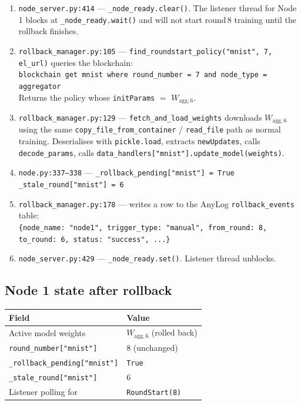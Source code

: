 \documentclass[11pt,a4paper]{article}
\newcommand{\Wagg}[1]{$W_{\text{agg},#1}$}
\begin{document}
\begin{enumerate}
  \item \texttt{node\_server.py:414} --- \texttt{\_node\_ready.clear()}.
        The listener thread for Node\,1 blocks at
        \texttt{\_node\_ready.wait()} and will not start round\,8
        training until the rollback finishes.

  \item \texttt{rollback\_manager.py:105} ---
        \texttt{find\_roundstart\_policy("mnist", 7, el\_url)}
        queries the blockchain:\\
        \texttt{blockchain get mnist where round\_number = 7 and node\_type = aggregator}\\
        Returns the policy whose \texttt{initParams} $=$ \Wagg{6}.

  \item \texttt{rollback\_manager.py:129} ---
        \texttt{fetch\_and\_load\_weights} downloads \Wagg{6} using the same
        \texttt{copy\_file\_from\_container} / \texttt{read\_file} path as
        normal training.  Deserialises with \texttt{pickle.load},
        extracts \texttt{newUpdates}, calls \texttt{decode\_params},
        calls \texttt{data\_handlers["mnist"].update\_model(weights)}.

  \item \texttt{node.py:337--338} ---
        \texttt{\_rollback\_pending["mnist"] = True}\\
        \texttt{\_stale\_round["mnist"] = 6}

  \item \texttt{rollback\_manager.py:178} --- writes a row to the
        AnyLog \texttt{rollback\_events} table:\\
        \texttt{\{node\_name: "node1", trigger\_type: "manual",
        from\_round: 8, to\_round: 6, status: "success", ...\}}

  \item \texttt{node\_server.py:429} --- \texttt{\_node\_ready.set()}.
        Listener thread unblocks.
\end{enumerate}

\subsection{Node 1 state after rollback}

\begin{table}[H]
\centering
\small
\begin{tabular}{ll}
\toprule
\textbf{Field} & \textbf{Value} \\
\midrule
Active model weights & \Wagg{6} (rolled back) \\
\texttt{round\_number["mnist"]} & 8 (unchanged) \\
\texttt{\_rollback\_pending["mnist"]} & \texttt{True} \\
\texttt{\_stale\_round["mnist"]} & 6 \\
Listener polling for & \texttt{RoundStart(8)} \\
\bottomrule
\end{tabular}
\end{table}
\end{document}
